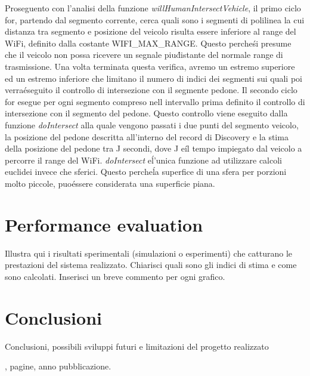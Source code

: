 \documentclass[conference]{IEEEtran}
\begin{document}
Proseguento con l'analisi della funzione \textit{willHumanIntersectVehicle}, il primo ciclo for, partendo dal segmento corrente, cerca quali sono i segmenti di polilinea la cui distanza tra segmento e posizione del veicolo risulta essere inferiore al range del WiFi, definito dalla costante WIFI\_MAX\_RANGE. Questo perche\' si presume che il veicolo non possa ricevere un segnale piu\' distante del normale range di trasmissione.
Una volta terminata questa verifica, avremo un estremo superiore ed un estremo inferiore che limitano il numero di indici dei segmenti sui quali poi verra\' eseguito il controllo di intersezione con il segmente pedone.
Il secondo ciclo for esegue per ogni segmento compreso nell intervallo prima definito il controllo di intersezione con il segmento del pedone.
Questo controllo viene eseguito dalla funzione \textit{doIntersect} alla quale vengono passati i due punti del segmento veicolo, la posizione del pedone descritta all'interno del record di Discovery e la stima della posizione del pedone tra J secondi, dove J e\' il tempo impiegato dal veicolo a percorre il range del WiFi.
\textit{doIntersect} e\' l'unica funzione ad utilizzare calcoli euclidei invece che sferici. Questo perche\' la superfice di una sfera per porzioni molto piccole, puo\' essere considerata una superficie piana.
 
 
 

\section{Performance evaluation}
Illustra qui i risultati sperimentali (simulazioni o esperimenti) che catturano le prestazioni del sistema realizzato. Chiarisci quali sono gli indici di stima
e come sono calcolati. Inserisci un breve commento per ogni grafico.

\section{Conclusioni}
Conclusioni, possibili sviluppi futuri e limitazioni del progetto realizzato


\begin{thebibliography}{15}

, pagine, anno pubblicazione.

\end{thebibliography}
\end{document}
